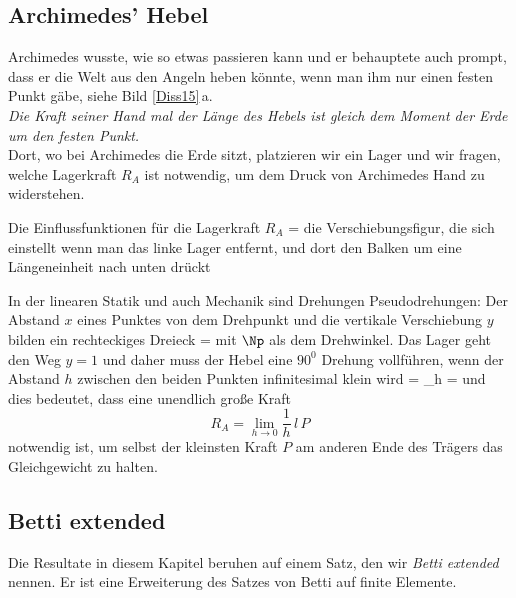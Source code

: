 {\textcolor{blau2}{\subsection{Archimedes' Hebel}}}
Archimedes wusste, wie so etwas passieren kann und er behauptete auch prompt, dass er die Welt aus den Angeln heben k\"{o}nnte, wenn man ihm nur einen festen Punkt g\"{a}be, siehe Bild \ref{Diss15}\,a.\\

{\em Die Kraft seiner Hand mal der L\"{a}nge des Hebels ist gleich dem Moment der Erde um den festen Punkt.\/}\\

Dort, wo bei Archimedes die Erde sitzt, platzieren wir ein Lager und wir fragen, welche Lagerkraft $R_A$ ist notwendig, um dem Druck von Archimedes Hand zu widerstehen.

Die Einflussfunktionen f\"{u}r die Lagerkraft $R_A$ = die Verschiebungsfigur, die sich einstellt wenn man das linke Lager entfernt, und dort den Balken um eine L\"{a}ngeneinheit nach unten dr\"{u}ckt

In der linearen Statik und auch Mechanik sind Drehungen Pseudodrehungen: Der Abstand $x$ eines Punktes von dem Drehpunkt und die vertikale Verschiebung $y$ bilden ein rechteckiges Dreieck
\beq
\tan \Np = 
\eeq
mit $\Np$ als dem Drehwinkel. Das Lager geht den Weg
$y = 1$ und daher muss der Hebel eine $90^0$ Drehung vollf\"{u}hren, wenn der Abstand $h$ zwischen den beiden Punkten infinitesimal klein wird
\beq
\tan \Np = \lim_{h }  = \infty
\eeq
und dies bedeutet, dass eine unendlich gro{\ss}e Kraft
\begin{equation}
R_A = \lim_{h \to 0} \frac{1}{h} \,l\,P
\end{equation}
notwendig ist, um selbst der kleinsten Kraft $P$ am anderen Ende des Tr\"{a}gers das Gleichgewicht zu halten.\\

{\textcolor{blau2}{\section{Betti extended}}}
Die Resultate in diesem Kapitel beruhen auf einem Satz, den wir {\em Betti extended\/} nennen. Er ist eine Erweiterung des Satzes von Betti auf finite Elemente.

